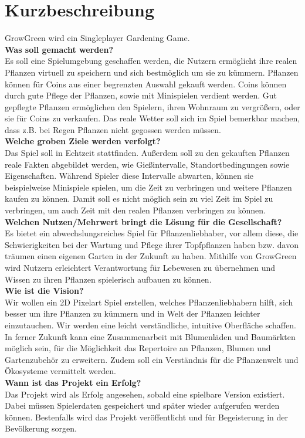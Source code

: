\chapter{Kurzbeschreibung}\label{sec:kurzbeschreibung}
GrowGreen wird ein Singleplayer Gardening Game.\\
\textbf{Was soll gemacht werden?}\\
Es soll eine Spielumgebung geschaffen werden, die Nutzern ermöglicht ihre realen Pflanzen virtuell zu speichern und sich bestmöglich um sie zu kümmern. Pflanzen können für Coins aus einer begrenzten Auswahl gekauft werden. Coins können durch gute Pflege der Pflanzen, sowie mit Minispielen verdient werden. Gut gepflegte Pflanzen ermöglichen den Spielern, ihren Wohnraum zu vergrößern, oder sie für Coins zu verkaufen. Das reale Wetter soll sich im Spiel bemerkbar machen, dass z.B. bei Regen Pflanzen nicht gegossen werden müssen.\\
\textbf{Welche groben Ziele werden verfolgt?}\\
Das Spiel soll in Echtzeit stattfinden. Außerdem soll zu den gekauften Pflanzen reale Fakten abgebildet werden, wie Gießintervalle, Standortbedingungen sowie Eigenschaften. Während Spieler diese Intervalle abwarten, können sie beispielweise Minispiele spielen, um die Zeit zu verbringen und weitere Pflanzen kaufen zu können. Damit soll es nicht möglich sein zu viel Zeit im Spiel zu verbringen, um auch Zeit mit den realen Pflanzen verbringen zu können.\\
\textbf{Welchen Nutzen/Mehrwert bringt die Lösung für die Gesellschaft?}\\
Es bietet ein abwechslungsreiches Spiel für Pflanzenliebhaber, vor allem diese, die Schwierigkeiten bei der Wartung und Pflege ihrer Topfpflanzen haben bzw. davon träumen einen eigenen Garten in der Zukunft zu haben. Mithilfe von GrowGreen wird Nutzern erleichtert Verantwortung für Lebewesen zu übernehmen und Wissen zu ihren Pflanzen spielerisch aufbauen zu können.\\
\textbf{Wie ist die Vision?}\\
Wir wollen ein 2D Pixelart Spiel erstellen, welches Pflanzenliebhabern hilft, sich besser um ihre Pflanzen zu kümmern und in Welt der Pflanzen leichter einzutauchen. Wir werden eine leicht verständliche, intuitive Oberfläche schaffen. In ferner Zukunft kann eine Zusammenarbeit mit Blumenläden und Baumärkten möglich sein, für die Möglichkeit das Repertoire an Pflanzen, Blumen und Gartenzubehör zu erweitern. Zudem soll ein Verständnis für die Pflanzenwelt und Ökosysteme vermittelt werden. \\
\textbf{Wann ist das Projekt ein Erfolg?}\\
Das Projekt wird als Erfolg angesehen, sobald eine spielbare Version existiert. Dabei müssen Spielerdaten gespeichert und später wieder aufgerufen werden können. Bestenfalls wird das Projekt veröffentlicht und für Begeisterung in der Bevölkerung sorgen. \\